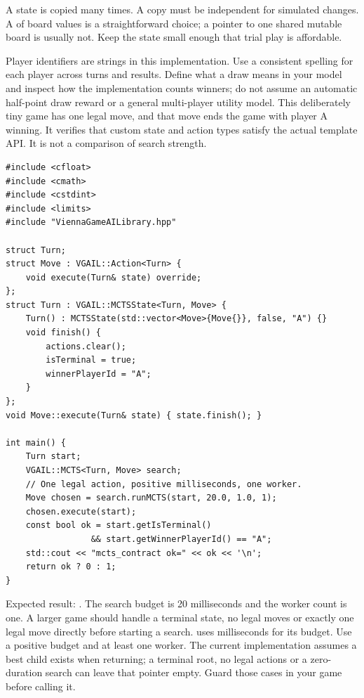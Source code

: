 \documentclass[11pt,a4paper]{article}
\begin{document}
A state is copied many times. A copy must be independent for simulated changes. A  of board values is a straightforward choice; a pointer to one shared mutable board is usually not. Keep the state small enough that trial play is affordable.

Player identifiers are strings in this implementation. Use a consistent spelling for each player across turns and results. Define what a draw means in your model and inspect how the implementation counts winners; do not assume an automatic half-point draw reward or a general multi-player utility model.
This deliberately tiny game has one legal move, and that move ends the game with player A winning. It verifies that custom state and action types satisfy the actual template API. It is not a comparison of search strength.%
\begin{lstlisting}
#include <cfloat>
#include <cmath>
#include <cstdint>
#include <limits>
#include "ViennaGameAILibrary.hpp"

struct Turn;
struct Move : VGAIL::Action<Turn> {
    void execute(Turn& state) override;
};
struct Turn : VGAIL::MCTSState<Turn, Move> {
    Turn() : MCTSState(std::vector<Move>{Move{}}, false, "A") {}
    void finish() {
        actions.clear();
        isTerminal = true;
        winnerPlayerId = "A";
    }
};
void Move::execute(Turn& state) { state.finish(); }

int main() {
    Turn start;
    VGAIL::MCTS<Turn, Move> search;
    // One legal action, positive milliseconds, one worker.
    Move chosen = search.runMCTS(start, 20.0, 1.0, 1);
    chosen.execute(start);
    const bool ok = start.getIsTerminal()
                 && start.getWinnerPlayerId() == "A";
    std::cout << "mcts_contract ok=" << ok << '\n';
    return ok ? 0 : 1;
}
\end{lstlisting}
Expected result: . The search budget is 20 milliseconds and the worker count is one. A larger game should handle a terminal state, no legal moves or exactly one legal move directly before starting a search.
 uses milliseconds for its budget. Use a positive budget and at least one worker. The current implementation assumes a best child exists when returning; a terminal root, no legal actions or a zero-duration search can leave that pointer empty. Guard those cases in your game before calling it.
\end{document}
